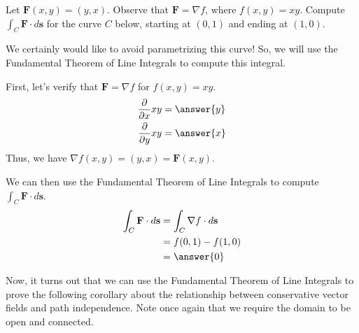 \documentclass{ximera}
\begin{document}
\begin{example}
Let $\textbf{F}(x,y)=(y,x)$. Observe that $\textbf{F}=\nabla f$, where $f(x,y)=xy$. Compute $\int_C\textbf{F}\cdot d\textbf{s}$ for the curve $C$ below, starting at $(0,1)$ and ending at $(1,0)$.
\begin{center}
\end{center}
\begin{explanation}
We certainly would like to avoid parametrizing this curve! So, we will use the Fundamental Theorem of Line Integrals to compute this integral.

First, let's verify that $\textbf{F}=\nabla f$ for $f(x,y)=xy$.
\begin{align*}
\frac{\partial}{\partial x}xy &= \answer{y}\\
\frac{\partial}{\partial y}xy &= \answer{x}
\end{align*}
Thus, we have $\nabla f(x,y)= (y,x) = \textbf{F}(x,y)$.

We can then use the Fundamental Theorem of Line Integrals to compute $\int_C\textbf{F}\cdot d\textbf{s}$.
\begin{align*}
\int_C\textbf{F}\cdot d\textbf{s} &= \int_C\nabla f\cdot d\textbf{s}\\
&= f(0,1) - f(1,0)\\
&= \answer{0}
\end{align*}

\end{explanation}
\end{example}

Now, it turns out that we can use the Fundamental Theorem of Line Integrals to prove the following corollary about the relationship between conservative vector fields and path independence. Note once again that we require the domain to be open and connected.
\end{document}
